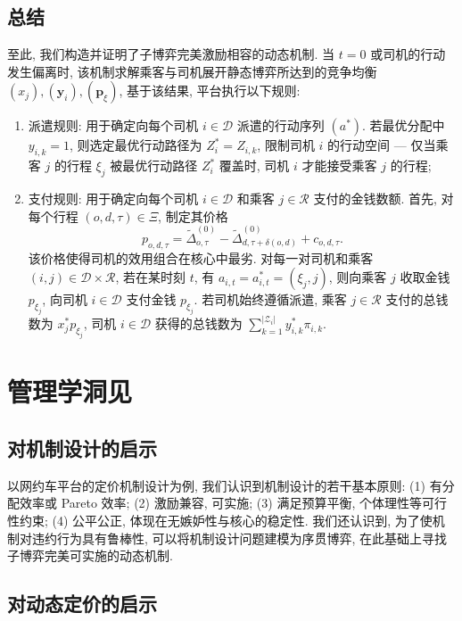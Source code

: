 \documentclass[10pt,twocolumn]{article}
\begin{document}
\subsection{总结}

至此, 我们构造并证明了子博弈完美激励相容的动态机制. 当 $t=0$ 或司机的行动发生偏离时, 该机制求解乘客与司机展开静态博弈所达到的竞争均衡 $(x_j), (\mathbf{y}_i), (\mathbf{p}_\xi)$, 基于该结果, 平台执行以下规则:
\begin{enumerate}[label=(\arabic*)]
  \item 派遣规则: 用于确定向每个司机 $i\in\mathcal{D}$ 派遣的行动序列 $(a^*)$. 若最优分配中 $y_{i,k} = 1$, 则选定最优行动路径为 $Z^*_{i} = Z_{i,k}$, 限制司机 $i$ 的行动空间 --- 仅当乘客 $j$ 的行程 $\xi_j$ 被最优行动路径 $Z^*_{i}$ 覆盖时, 司机 $i$ 才能接受乘客 $j$ 的行程;
  \item 支付规则: 用于确定向每个司机 $i\in\mathcal{D}$ 和乘客 $j\in\mathcal{R}$ 支付的金钱数额. 首先, 对每个行程 $(o,d,\tau)\in \Xi$, 制定其价格 $$p_{o,d,\tau} = \tilde{\Delta}^{(0)}_{o,\tau} - \tilde{\Delta}^{(0)}_{d,\tau+\delta(o,d)} + c_{o,d,\tau}.$$ 该价格使得司机的效用组合在核心中最劣. 对每一对司机和乘客 $(i,j)\in\mathcal{D}\times\mathcal{R}$, 若在某时刻 $t$, 有 $a_{i,t} = a^*_{i,t} = (\xi_j, j)$, 则向乘客 $j$ 收取金钱 $p_{\xi_j}$, 向司机 $i\in\mathcal{D}$ 支付金钱 $p_{\xi_j}$. 若司机始终遵循派遣, 乘客 $j\in\mathcal{R}$ 支付的总钱数为 $x^*_j p_{\xi_j}$, 司机 $i\in\mathcal{D}$ 获得的总钱数为 $\sum_{k=1}^{|\mathcal{Z}_i|} y^*_{i,k} \pi_{i,k}$.
\end{enumerate}

\section{管理学洞见}

\subsection{对机制设计的启示}

以网约车平台的定价机制设计为例, 我们认识到机制设计的若干基本原则: (1) 有分配效率或 Pareto 效率; (2) 激励兼容, 可实施; (3) 满足预算平衡, 个体理性等可行性约束; (4) 公平公正, 体现在无嫉妒性与核心的稳定性. 我们还认识到, 为了使机制对违约行为具有鲁棒性, 可以将机制设计问题建模为序贯博弈, 在此基础上寻找子博弈完美可实施的动态机制.

\subsection{对动态定价的启示}
\end{document}
